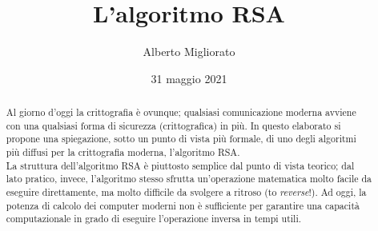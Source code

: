 \documentclass[a4paper,12pt]{article}
\begin{document}
\title{L'algoritmo RSA}
\author{Alberto Migliorato}
\date{31 maggio 2021}
\maketitle
\thispagestyle{empty}
\begin{abstract}
Al giorno d'oggi la crittografia è ovunque; qualsiasi comunicazione moderna avviene con una qualsiasi forma di sicurezza (crittografica) in più. In questo elaborato si propone una spiegazione, sotto un punto di vista più formale, di uno degli algoritmi più diffusi per la crittografia moderna, l'algoritmo RSA.\\
La struttura dell'algoritmo RSA è piuttosto semplice dal punto di vista teorico; dal lato pratico, invece, l'algoritmo stesso sfrutta un'operazione matematica molto facile da eseguire direttamente, ma molto difficile da svolgere a ritroso (to \emph{reverse}!). Ad oggi, la potenza di calcolo dei computer moderni non è sufficiente per garantire una capacità computazionale in grado di eseguire l'operazione inversa in tempi utili.
\end{abstract}
\newpage
\tableofcontents
\newpage
\end{document}
